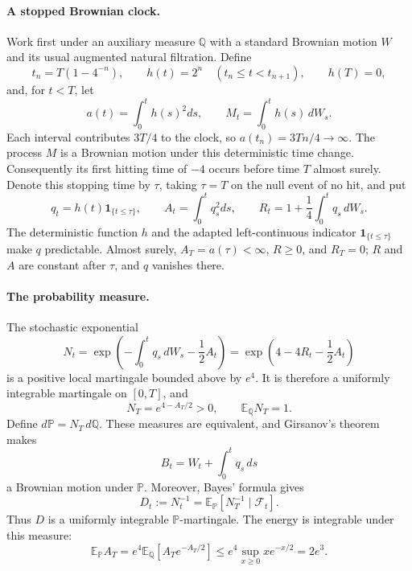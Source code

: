 \documentclass[11pt]{article}
\begin{document}
\paragraph{A stopped Brownian clock.}
Work first under an auxiliary measure $\mathbb Q$ with a standard Brownian motion $W$ and its usual augmented natural filtration. Define
\[
 t_n=T(1-4^{-n}),\qquad h(t)=2^n\quad(t_n\leq t<t_{n+1}),
 \qquad h(T)=0,
\]
and, for $t<T$, let
\[
 a(t)=\int_0^t h(s)^2ds,\qquad M_t=\int_0^t h(s)\,dW_s.
\]
Each interval contributes $3T/4$ to the clock, so $a(t_n)=3Tn/4\to\infty$. The process $M$ is a Brownian motion under this deterministic time change. Consequently its first hitting time of $-4$ occurs before time $T$ almost surely. Denote this stopping time by $\tau$, taking $\tau=T$ on the null event of no hit, and put
\begin{equation}\label{eq:stopped}
 q_t=h(t)\mathbf1_{\{t\leq\tau\}},\qquad
 A_t=\int_0^t q_s^2ds,\qquad
 R_t=1+\frac14\int_0^t q_s\,dW_s.
\end{equation}
The deterministic function $h$ and the adapted left-continuous indicator $\mathbf1_{\{t\leq\tau\}}$ make $q$ predictable. Almost surely, $A_T=a(\tau)<\infty$, $R\geq0$, and $R_T=0$; $R$ and $A$ are constant after $\tau$, and $q$ vanishes there.

\paragraph{The probability measure.}
The stochastic exponential
\begin{equation}\label{eq:density}
 N_t=\exp\left(-\int_0^t q_s\,dW_s-\frac12A_t\right)
     =\exp\left(4-4R_t-\frac12A_t\right)
\end{equation}
is a positive local martingale bounded above by $e^4$. It is therefore a uniformly integrable martingale on $[0,T]$, and
\[
 N_T=e^{4-A_T/2}>0,\qquad \mathbb E_{\mathbb Q}N_T=1.
\]
Define $d\mathbb P=N_T\,d\mathbb Q$. These measures are equivalent, and Girsanov's theorem makes
\[
 B_t=W_t+\int_0^t q_s\,ds
\]
a Brownian motion under $\mathbb P$. Moreover, Bayes' formula gives
\begin{equation}\label{eq:reciprocal}
 D_t:=N_t^{-1}=\mathbb E_{\mathbb P}[N_T^{-1}\mid\mathcal F_t].
\end{equation}
Thus $D$ is a uniformly integrable $\mathbb P$-martingale. The energy is integrable under this measure:
\begin{equation}\label{eq:energy}
 \mathbb E_{\mathbb P}A_T=e^4\mathbb E_{\mathbb Q}[A_Te^{-A_T/2}]
 \leq e^4\sup_{x\geq0}xe^{-x/2}=2e^3.
\end{equation}
\end{document}

